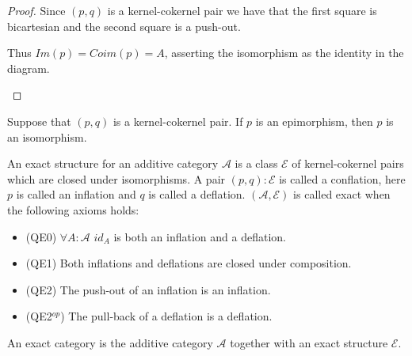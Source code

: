     \begin{proof}
        Since $(p,q)$ is a kernel-cokernel pair we have that the first square is bicartesian and the second square is a push-out.
        \begin{center}
        \end{center}
        Thus $Im(p)=Coim(p)=A$, asserting the isomorphism as the identity in the diagram.
        \begin{center}
        \end{center}
    \end{proof}

    \begin{corollary}
        Suppose that $(p,q)$ is a kernel-cokernel pair. If $p$ is an epimorphism, then $p$ is an isomorphism.
    \end{corollary}

    \begin{definition}
        An exact structure for an additive category $\mathcal{A}$ is a class $\mathcal{E}$ of kernel-cokernel pairs which are closed under isomorphisms. A pair $(p,q):\mathcal{E}$ is called a conflation, here $p$ is called an inflation and $q$ is called a deflation. $(\mathcal{A},\mathcal{E})$ is called exact when the following axioms holds:
        \begin{itemize}
            \item (QE0) $\forall A:\mathcal{A}$ $id_A$ is both an inflation and a deflation.
            \item (QE1) Both inflations and deflations are closed under composition.
            \item (QE2) The push-out of an inflation is an inflation.
            \item (QE2$^{op}$) The pull-back of a deflation is a deflation.
        \end{itemize}

        An exact category is the additive category $\mathcal{A}$ together with an exact structure $\mathcal{E}$.
    \end{definition}


